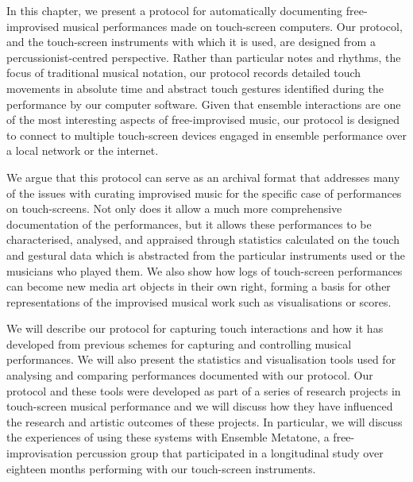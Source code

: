 \documentclass[graybox]{svmult}
\begin{document}
In this chapter, we present a protocol for automatically documenting
free-improvised musical performances made on touch-screen computers.
Our protocol, and the touch-screen instruments with which it is used,
are designed from a percussionist-centred perspective. Rather than
particular notes and rhythms, the focus of traditional musical
notation, our protocol records detailed touch movements in absolute
time and abstract touch gestures identified during the performance by our
computer software. Given that ensemble interactions are one of the
most interesting aspects of free-improvised music, our protocol is designed
to connect to multiple touch-screen devices engaged in ensemble
performance over a local network or the internet.

We argue that this protocol can serve as an archival format that
addresses many of the issues with curating improvised music for the
specific case of performances on touch-screens. Not only does it allow
a much more comprehensive documentation of the performances, but it
allows these performances to be characterised, analysed, and
appraised through statistics calculated on the touch and gestural data
which is abstracted from the particular instruments used or the
musicians who played them. We also show how logs of touch-screen
performances can become new media art objects in their own right,
forming a basis for other representations of the improvised musical
work such as visualisations or scores.

We will describe our protocol for capturing touch interactions and how
it has developed from previous schemes for capturing and controlling
musical performances. We will also present the statistics and
visualisation tools used for analysing and comparing performances
documented with our protocol. Our protocol and these tools were
developed as part of a series of research projects in touch-screen
musical performance and we will discuss how they have influenced the
research and artistic outcomes of these projects. In particular, we
will discuss the experiences of using these systems with Ensemble
Metatone, a free-improvisation percussion group that participated in a
longitudinal study over eighteen months performing with our
touch-screen instruments.


\end{document}
